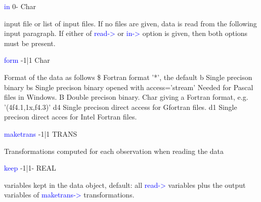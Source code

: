\vspace{0.3cm}
\hline
\vspace{0.3cm}
\noindent \textcolor{blue}{in}  \tabto{3cm} 0- \tabto{5cm}  Char \tabto{7cm}
\begin{changemargin}{3cm}{0cm}
\noindent input file or list of input files. If no files are given, data is read from the following input
paragraph. If either of \textcolor{blue}{read->} or \textcolor{blue}{in->} option is given, then both options must
be present.
\end{changemargin}
\vspace{0.3cm}
\hline
\vspace{0.3cm}
\noindent \textcolor{blue}{form}  \tabto{3cm} -1|1 \tabto{5cm}  Char \tabto{7cm}
\begin{changemargin}{3cm}{0cm}
\noindent  Format of the data as follows \newline
\$  Fortran format '*', the default \newline
b    Single precison binary \newline
bs  Single precison binary opened with access='stream'
Needed for Pascal files in Windows. \newline
B  Double precison binary.\newline
Char giving a Fortran format, e.g. '(4f4.1,1x,f4.3)' \newline
d4 Single precison direct access for Gfortran files.\newline
d1 Single precison direct acces for Intel Fortran files.
\end{changemargin}
\vspace{0.3cm}
\hline
\vspace{0.3cm}
\noindent \textcolor{blue}{maketrans} \tabto{3cm} -1|1 \tabto{5cm}  TRANS  \tabto{7cm}
\begin{changemargin}{3cm}{0cm}
\noindent Transformations computed for each observation when reading the data
\end{changemargin}
\vspace{0.3cm}
\hline
\vspace{0.3cm}
\noindent \textcolor{blue}{keep} \tabto{3cm} -1|1- \tabto{5cm}  REAL \tabto{7cm}
\begin{changemargin}{3cm}{0cm}
\noindent  variables kept in the data object, default: all \textcolor{blue}{read->} variables plus the output
variables of \textcolor{blue}{maketrans->} transformations.
\end{changemargin}
\vspace{0.3cm}
\hline
\vspace{0.3cm}
